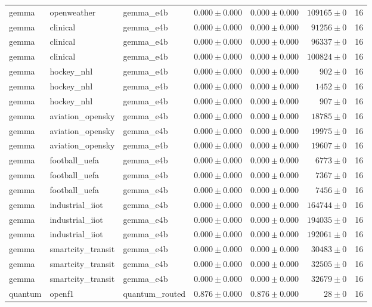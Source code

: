 \begin{table}[htbp]
\begin{tabular}{l l l r r r r}
gemma & openweather & gemma\_e4b & $0.000\pm0.000$ & $0.000\pm0.000$ & $109165\pm0$ & 16 \\
gemma & clinical & gemma\_e4b & $0.000\pm0.000$ & $0.000\pm0.000$ & $91256\pm0$ & 16 \\
gemma & clinical & gemma\_e4b & $0.000\pm0.000$ & $0.000\pm0.000$ & $96337\pm0$ & 16 \\
gemma & clinical & gemma\_e4b & $0.000\pm0.000$ & $0.000\pm0.000$ & $100824\pm0$ & 16 \\
gemma & hockey\_nhl & gemma\_e4b & $0.000\pm0.000$ & $0.000\pm0.000$ & $902\pm0$ & 16 \\
gemma & hockey\_nhl & gemma\_e4b & $0.000\pm0.000$ & $0.000\pm0.000$ & $1452\pm0$ & 16 \\
gemma & hockey\_nhl & gemma\_e4b & $0.000\pm0.000$ & $0.000\pm0.000$ & $907\pm0$ & 16 \\
gemma & aviation\_opensky & gemma\_e4b & $0.000\pm0.000$ & $0.000\pm0.000$ & $18785\pm0$ & 16 \\
gemma & aviation\_opensky & gemma\_e4b & $0.000\pm0.000$ & $0.000\pm0.000$ & $19975\pm0$ & 16 \\
gemma & aviation\_opensky & gemma\_e4b & $0.000\pm0.000$ & $0.000\pm0.000$ & $19607\pm0$ & 16 \\
gemma & football\_uefa & gemma\_e4b & $0.000\pm0.000$ & $0.000\pm0.000$ & $6773\pm0$ & 16 \\
gemma & football\_uefa & gemma\_e4b & $0.000\pm0.000$ & $0.000\pm0.000$ & $7367\pm0$ & 16 \\
gemma & football\_uefa & gemma\_e4b & $0.000\pm0.000$ & $0.000\pm0.000$ & $7456\pm0$ & 16 \\
gemma & industrial\_iiot & gemma\_e4b & $0.000\pm0.000$ & $0.000\pm0.000$ & $164744\pm0$ & 16 \\
gemma & industrial\_iiot & gemma\_e4b & $0.000\pm0.000$ & $0.000\pm0.000$ & $194035\pm0$ & 16 \\
gemma & industrial\_iiot & gemma\_e4b & $0.000\pm0.000$ & $0.000\pm0.000$ & $192061\pm0$ & 16 \\
gemma & smartcity\_transit & gemma\_e4b & $0.000\pm0.000$ & $0.000\pm0.000$ & $30483\pm0$ & 16 \\
gemma & smartcity\_transit & gemma\_e4b & $0.000\pm0.000$ & $0.000\pm0.000$ & $32505\pm0$ & 16 \\
gemma & smartcity\_transit & gemma\_e4b & $0.000\pm0.000$ & $0.000\pm0.000$ & $32679\pm0$ & 16 \\
quantum & openf1 & quantum\_routed & $0.876\pm0.000$ & $0.876\pm0.000$ & $28\pm0$ & 16 \\

\end{tabular}
\end{table}
